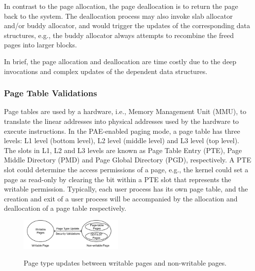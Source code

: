 In contrast to the page allocation, the page deallocation is to return the page back to the system.
The deallocation process may also invoke slab allocator and/or buddy allocator, and would trigger the updates of the corresponding data structures,
e.g., the buddy allocator always attempts to recombine the freed pages into larger blocks.

In brief, the page allocation and deallocation are time costly due to the deep invocations and complex updates of the dependent data structures.


\subsubsection{Page Table Validations}\label{sec:pv-security}
Page tables are used by a hardware, i.e., Memory Management Unit (MMU), to translate the linear addresses into physical addresses used by the hardware to execute instructions.
In the PAE-enabled paging mode, a page table has three levels: L1 level (bottom level), L2 level (middle level) and L3 level (top level).
The slots in L1, L2 and L3 levels are known as Page Table Entry (PTE), Page Middle Directory (PMD) and Page Global Directory (PGD), respectively.
A PTE slot could determine the access permissions of a page, e.g., the kernel could set a page as read-only by clearing the bit within a PTE slot that represents the writable permission.
Typically, each user process has its own page table, and the creation and exit of a user process will be accompanied by the allocation and deallocation of a page table respectively.
\begin{figure}[ht]
\centering
\includegraphics[width=0.45\textwidth]{image/background/page-type-update.png} \\
\caption{Page type updates between writable pages and non-writable pages. }
\label{fig:page-type-updates}
\end{figure}



